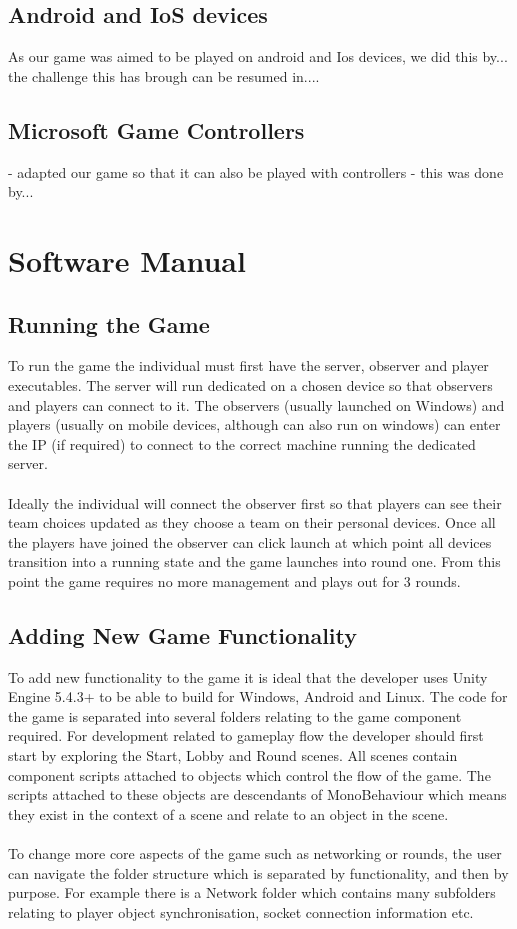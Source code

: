 \documentclass[11pt,a4paper]{article}
\begin{document}
 \subsection{Android and IoS devices} 
 As our game was aimed to be played on android and Ios devices, we did this by... the challenge this has brough can be resumed in....

 \subsection{Microsoft Game Controllers}
 - adapted our game so that it can also be played with controllers - this was done by... 


\pagebreak

 \section{Software Manual}

 \subsection{Running the Game}
 To run the game the individual must first have the server, observer and player executables. The server will run dedicated on a chosen device so that observers and players can connect to it. The observers (usually launched on Windows)  and players (usually on mobile devices, although can also run on windows) can enter the IP (if required) to connect to the correct machine running the dedicated server. \\ \\
 Ideally the individual will connect the observer first so that players can see their team choices updated as they choose a team on their personal devices. Once all the players have joined the observer can click launch at which point all devices transition into a running state and the game launches into round one. From this point the game requires no more management and plays out for 3 rounds.

 \subsection{Adding New Game Functionality}
 To add new functionality to the game it is ideal that the developer uses Unity Engine 5.4.3+ to be able to build for Windows, Android and Linux. The code for the game is separated into several folders relating to the game component required. For development related to gameplay flow the developer should first start by exploring the Start, Lobby and Round scenes. All scenes contain component scripts attached to objects which control the flow of the game. The scripts attached to these objects are descendants of MonoBehaviour which means they exist in the context of a scene and relate to an object in the scene.\\ \\
 To change more core aspects of the game such as networking or rounds, the user can navigate the folder structure which is separated by functionality, and then by purpose. For example there is a Network folder which contains many subfolders relating to player object synchronisation, socket connection information etc.
\end{document}
